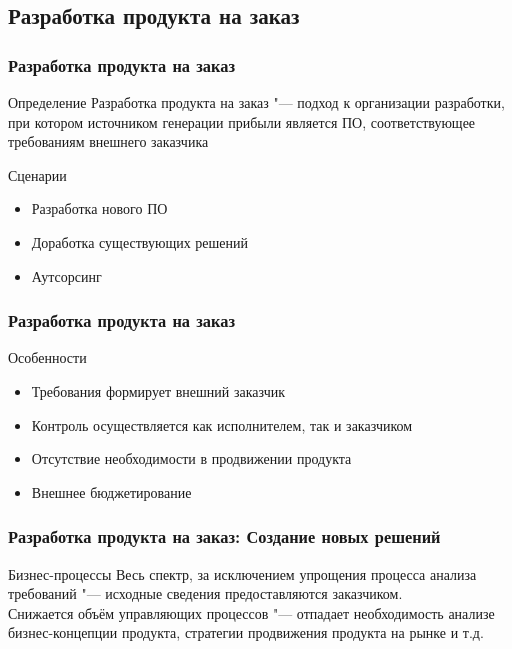 \documentclass{../industrial-development}
\begin{document}
\subsection{Разработка продукта на заказ}


\begin{frame} \frametitle{Разработка продукта на заказ}
	\begin{block}{Определение}
		\alert{Разработка продукта на заказ} "--- подход к организации разработки, при котором источником генерации прибыли является ПО, соответствующее требованиям внешнего заказчика
	\end{block}
	\begin{block}{Сценарии}
		\begin{itemize}
			\item Разработка нового ПО
			\item Доработка существующих решений
			\item Аутсорсинг
		\end{itemize}
	\end{block}
\end{frame}
\lecturenotes


\begin{frame} \frametitle{Разработка продукта на заказ}
	\begin{block}{Особенности}
		\begin{itemize}
			\item Требования формирует внешний заказчик
			\item Контроль осуществляется как исполнителем, так и заказчиком
			\item Отсутствие необходимости в продвижении продукта
			\item Внешнее бюджетирование
		\end{itemize}
	\end{block}
\end{frame}
\lecturenotes


\begin{frame} \frametitle{Разработка продукта на заказ: Создание новых решений}
	\begin{block}{Бизнес-процессы}
		Весь спектр, за исключением упрощения процесса анализа требований "--- исходные сведения предоставляются заказчиком.\\
		Снижается объём управляющих процессов "--- отпадает необходимость анализе бизнес-концепции продукта, стратегии продвижения продукта на рынке и т.д.
	\end{block}
\end{frame}
\lecturenotes
\end{document}
